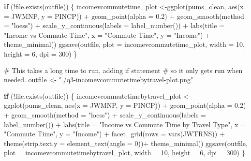 \documentclass[
  letterpaper,
  DIV=11,
  numbers=noendperiod]{scrartcl}
\newenvironment{Shaded}{\begin{snugshade}}{\end{snugshade}}
\newcommand{\AttributeTok}[1]{\textcolor[rgb]{0.40,0.45,0.13}{#1}}
\newcommand{\CommentTok}[1]{\textcolor[rgb]{0.37,0.37,0.37}{#1}}
\newcommand{\ControlFlowTok}[1]{\textcolor[rgb]{0.00,0.23,0.31}{\textbf{#1}}}
\newcommand{\DecValTok}[1]{\textcolor[rgb]{0.68,0.00,0.00}{#1}}
\newcommand{\FloatTok}[1]{\textcolor[rgb]{0.68,0.00,0.00}{#1}}
\newcommand{\FunctionTok}[1]{\textcolor[rgb]{0.28,0.35,0.67}{#1}}
\newcommand{\NormalTok}[1]{\textcolor[rgb]{0.00,0.23,0.31}{#1}}
\newcommand{\OtherTok}[1]{\textcolor[rgb]{0.00,0.23,0.31}{#1}}
\newcommand{\SpecialCharTok}[1]{\textcolor[rgb]{0.37,0.37,0.37}{#1}}
\newcommand{\StringTok}[1]{\textcolor[rgb]{0.13,0.47,0.30}{#1}}
\begin{document}
\begin{Shaded}
\begin{Highlighting}[]
\ControlFlowTok{if}\NormalTok{ (}\SpecialCharTok{!}\FunctionTok{file.exists}\NormalTok{(outfile)) \{}
\NormalTok{  incomevcommutetime\_plot }\OtherTok{\textless{}{-}}\FunctionTok{ggplot}\NormalTok{(pums\_clean, }\FunctionTok{aes}\NormalTok{(}\AttributeTok{x =}\NormalTok{ JWMNP, }\AttributeTok{y =}\NormalTok{ PINCP)) }\SpecialCharTok{+}
    \FunctionTok{geom\_point}\NormalTok{(}\AttributeTok{alpha =} \FloatTok{0.2}\NormalTok{) }\SpecialCharTok{+}
    \FunctionTok{geom\_smooth}\NormalTok{(}\AttributeTok{method =} \StringTok{"loess"}\NormalTok{) }\SpecialCharTok{+}
    \FunctionTok{scale\_y\_continuous}\NormalTok{(}\AttributeTok{labels =} \FunctionTok{label\_number}\NormalTok{()) }\SpecialCharTok{+}
    \FunctionTok{labs}\NormalTok{(}\AttributeTok{title =} \StringTok{"Income vs Commute Time"}\NormalTok{, }\AttributeTok{x =} \StringTok{"Commute Time"}\NormalTok{, }\AttributeTok{y =} \StringTok{"Income"}\NormalTok{) }\SpecialCharTok{+}
    \FunctionTok{theme\_minimal}\NormalTok{()}
    \FunctionTok{ggsave}\NormalTok{(outfile, }\AttributeTok{plot =}\NormalTok{ incomevcommutetime\_plot, }\AttributeTok{width =} \DecValTok{10}\NormalTok{, }\AttributeTok{height =} \DecValTok{6}\NormalTok{, }\AttributeTok{dpi =} \DecValTok{300}\NormalTok{)}
\NormalTok{\}}

  
\CommentTok{\# This takes a long time to run, adding if statement}
\CommentTok{\# so it only gets run when needed.}
\NormalTok{outfile }\OtherTok{\textless{}{-}} \StringTok{"./q3{-}incomevcommutetimebytravel{-}plot.png"}

\ControlFlowTok{if}\NormalTok{ (}\SpecialCharTok{!}\FunctionTok{file.exists}\NormalTok{(outfile)) \{}
\NormalTok{  incomevcommutetimebytravel\_plot }\OtherTok{\textless{}{-}}\FunctionTok{ggplot}\NormalTok{(pums\_clean, }\FunctionTok{aes}\NormalTok{(}\AttributeTok{x =}\NormalTok{ JWMNP, }\AttributeTok{y =}\NormalTok{ PINCP)) }\SpecialCharTok{+}
    \FunctionTok{geom\_point}\NormalTok{(}\AttributeTok{alpha =} \FloatTok{0.2}\NormalTok{) }\SpecialCharTok{+}
    \FunctionTok{geom\_smooth}\NormalTok{(}\AttributeTok{method =} \StringTok{"loess"}\NormalTok{) }\SpecialCharTok{+}
    \FunctionTok{scale\_y\_continuous}\NormalTok{(}\AttributeTok{labels =} \FunctionTok{label\_number}\NormalTok{()) }\SpecialCharTok{+}
    \FunctionTok{labs}\NormalTok{(}\AttributeTok{title =} \StringTok{"Income vs Commute Time by Travel Type"}\NormalTok{, }\AttributeTok{x =} \StringTok{"Commute Time"}\NormalTok{, }\AttributeTok{y =} \StringTok{"Income"}\NormalTok{) }\SpecialCharTok{+}
    \FunctionTok{facet\_grid}\NormalTok{(}\AttributeTok{rows =} \FunctionTok{vars}\NormalTok{(JWTRNS)) }\SpecialCharTok{+}
    \FunctionTok{theme}\NormalTok{(}\AttributeTok{strip.text.y =} \FunctionTok{element\_text}\NormalTok{(}\AttributeTok{angle =} \DecValTok{0}\NormalTok{))}\SpecialCharTok{+}
    \FunctionTok{theme\_minimal}\NormalTok{()}
    \FunctionTok{ggsave}\NormalTok{(outfile, }\AttributeTok{plot =}\NormalTok{ incomevcommutetimebytravel\_plot, }\AttributeTok{width =} \DecValTok{10}\NormalTok{, }\AttributeTok{height =} \DecValTok{6}\NormalTok{, }\AttributeTok{dpi =} \DecValTok{300}\NormalTok{)}
\NormalTok{\}}


\end{Highlighting}
\end{Shaded}
\end{document}
